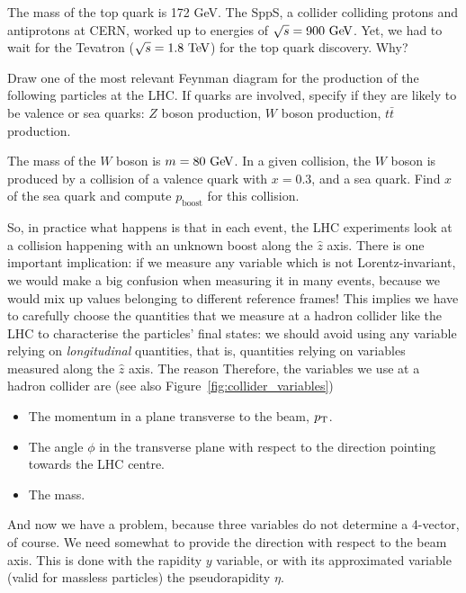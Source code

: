 \begin{exercise}
The mass of the top quark is 172 GeV. The SppS, a collider colliding protons and antiprotons at CERN, worked up to energies of $\sqrt{s} = 900\ \text{Ge\kern -0.1em V}$. Yet, we had to wait for the Tevatron ($\sqrt{s} = 1.8\ \TeV$) for the top quark discovery. Why?
\end{exercise}

\begin{exercise}
Draw one of the most relevant Feynman diagram for the production of the following particles at the LHC. If quarks are involved, specify if they are likely to be valence or sea quarks: $Z$ boson production, $W$ boson production, $t\bar{t}$ production.
\end{exercise}

\begin{exercise}
The mass of the $W$ boson is $m = 80\ \text{Ge\kern -0.1em V}$. In a given collision, the $W$ boson is produced by a collision of a valence quark with $x = 0.3$,  and a sea quark. Find $x$ of the sea quark and compute $p_{\mathrm{boost}}$ for this collision.
\end{exercise}


So, in practice what happens is that in each event, the LHC experiments look at a collision happening with an unknown boost along the $\hat{z}$ axis. There is one important implication: if we measure any variable which is not Lorentz-invariant, we would make a big confusion when measuring it in many events, because we would mix up values belonging to different reference frames! This implies we have to carefully choose the quantities that we measure at a hadron collider like the LHC to characterise the particles' final states: we should avoid using any variable relying on \textit{longitudinal} quantities, that is, quantities relying on variables measured along the $\hat{z}$ axis. The reason  Therefore, the variables we use at a hadron collider are (see also Figure~\ref{fig:collider_variables}) 

\begin{itemize}
\item The momentum in a plane transverse to the beam, $p_{\mathrm{T}}$.
\item The angle $\phi$ in the transverse plane with respect to the direction pointing towards the LHC centre.
\item The mass.
\end{itemize}

And now we have a problem, because three variables do not determine a 4-vector, of course. We need somewhat to provide the direction with respect to the beam axis. This is done with the rapidity $y$ variable, or with its approximated variable (valid for massless particles) the pseudorapidity $\eta$. 

